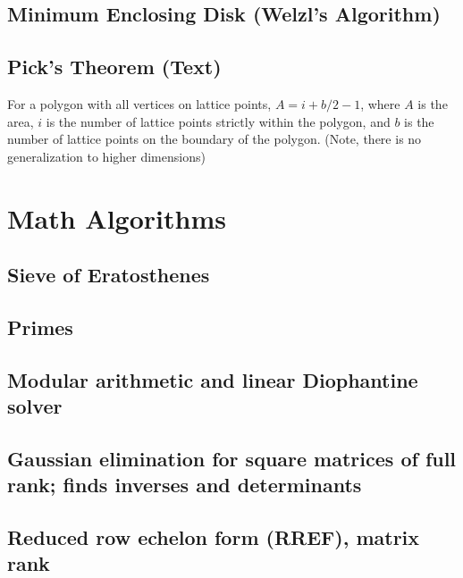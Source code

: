 \documentclass[9pt]{extarticle}
\begin{document}
\begin{multicols*}{3}
\subsection{Minimum Enclosing Disk (Welzl's Algorithm)} %


\subsection{Pick's Theorem (Text)} %
For a polygon with all vertices on lattice points, $A = i + b/2 - 1$, where $A$
is the area, $i$ is the number of lattice points strictly within the polygon,
and $b$ is the number of lattice points on the boundary of the polygon. (Note,
there is no generalization to higher dimensions)

\section{Math Algorithms}

\subsection{Sieve of Eratosthenes} %


\subsection{Primes}


\subsection{Modular arithmetic and linear Diophantine solver} %


\subsection{Gaussian elimination for square matrices of full rank; finds
inverses and determinants} %


\subsection{Reduced row echelon form (RREF), matrix rank} %



\end{multicols*}
\end{document}
